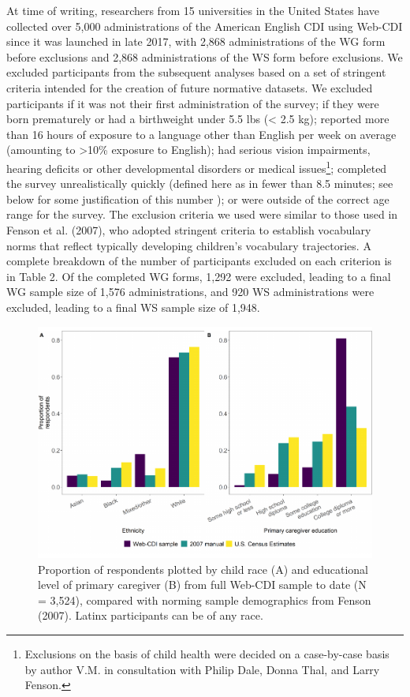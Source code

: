 \documentclass[
  english,
  ,man,floatsintext]{apa6}
\begin{document}
At time of writing, researchers from 15 universities in the United States have collected over 5,000 administrations of the American English CDI using Web-CDI since it was launched in late 2017, with 2,868 administrations of the WG form before exclusions and 2,868 administrations of the WS form before exclusions. We excluded participants from the subsequent analyses based on a set of stringent criteria intended for the creation of future normative datasets. We excluded participants if it was not their first administration of the survey; if they were born prematurely or had a birthweight under 5.5 lbs (\textless{} 2.5 kg); reported more than 16 hours of exposure to a language other than English per week on average (amounting to \textgreater10\% exposure to English); had serious vision impairments, hearing deficits or other developmental disorders or medical issues\footnote{Exclusions on the basis of child health were decided on a case-by-case basis by author V.M. in consultation with Philip Dale, Donna Thal, and Larry Fenson.}; completed the survey unrealistically quickly (defined here as in fewer than 8.5 minutes; see below for some justification of this number ); or were outside of the correct age range for the survey. The exclusion criteria we used were similar to those used in Fenson et al. (2007), who adopted stringent criteria to establish vocabulary norms that reflect typically developing children's vocabulary trajectories. A complete breakdown of the number of participants excluded on each criterion is in Table 2. Of the completed WG forms, 1,292 were excluded, leading to a final WG sample size of 1,576 administrations, and 920 WS administrations were excluded, leading to a final WS sample size of 1,948.

\begin{figure}
\centering
\includegraphics{webcdi_paper_files/figure-latex/demobarfig-1.pdf}
\caption{\label{fig:demobarfig}Proportion of respondents plotted by child race (A) and educational level of primary caregiver (B) from full Web-CDI sample to date (N = 3,524), compared with norming sample demographics from Fenson (2007). Latinx participants can be of any race.}
\end{figure}
\end{document}
